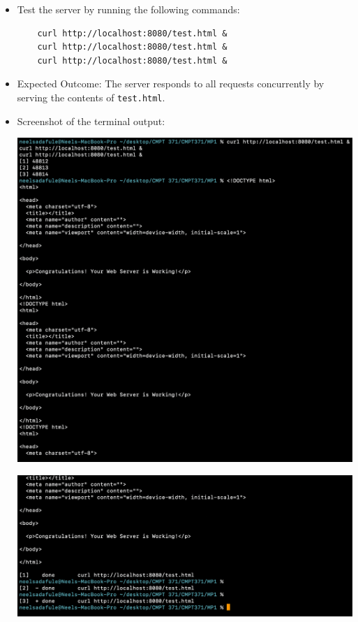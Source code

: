 \documentclass{article}
\begin{document}
\begin{itemize}
    \item Test the server by running the following commands:
    \begin{lstlisting}
    curl http://localhost:8080/test.html &
    curl http://localhost:8080/test.html &
    curl http://localhost:8080/test.html &
    \end{lstlisting}
    \item Expected Outcome: The server responds to all requests concurrently by serving the contents of \texttt{test.html}.
    \item Screenshot of the terminal output:
    \begin{center}
        \includegraphics[width=\textwidth]{screenshots/multithreaded_test1.png}  %
    \end{center}
    \begin{center}
        \includegraphics[width=\textwidth]{screenshots/multithreaded_test2.png}  %
    \end{center}
\end{itemize}
\end{document}
